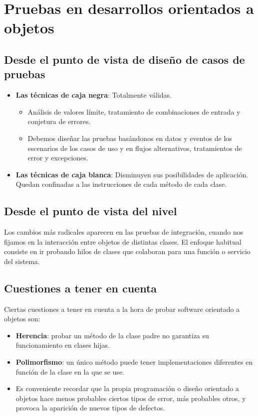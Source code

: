 \newpage
\section{Pruebas en desarrollos orientados a objetos}
\subsection{Desde el punto de vista de diseño de casos de pruebas}
\begin{itemize}
    \item \textbf{Las técnicas de caja negra}: Totalmente válidas.
          \begin{itemize}
              \item Análisis de valores límite, tratamiento de combinaciones de entrada y conjetura de errores.
              \item Debemos diseñar las pruebas basándonos en datos y eventos de los escenarios de los casos de uso y en flujos alternativos, tratamientos de error y excepciones.
          \end{itemize}
    \item \textbf{Las técnicas de caja blanca}: Disminuyen sus posibilidades de aplicación. Quedan confinadas a las instrucciones de cada método de cada clase.
\end{itemize}

\subsection{Desde el punto de vista del nivel}
Los cambios más radicales aparecen en las pruebas de integración, cuando nos fijamos en la interacción entre objetos de distintas clases. El enfoque habitual consiste en ir probando hilos de clases que colaboran para una función o servicio del sistema.

\subsection{Cuestiones a tener en cuenta}
Ciertas cuestiones a tener en cuenta a la hora de probar software orientado a objetos son:
\begin{itemize}
    \item \textbf{Herencia}: probar un método de la clase padre no garantiza su funcionamiento en clases hijas.
    \item \textbf{Polimorfismo}: un único método puede tener implementaciones diferentes en función de la clase en la que se use.
    \item Es conveniente recordar que la propia programación o diseño orientado a objetos hace menos probables ciertos tipos de error, más probables otros, y provoca la aparición de nuevos tipos de defectos. %
\end{itemize}

